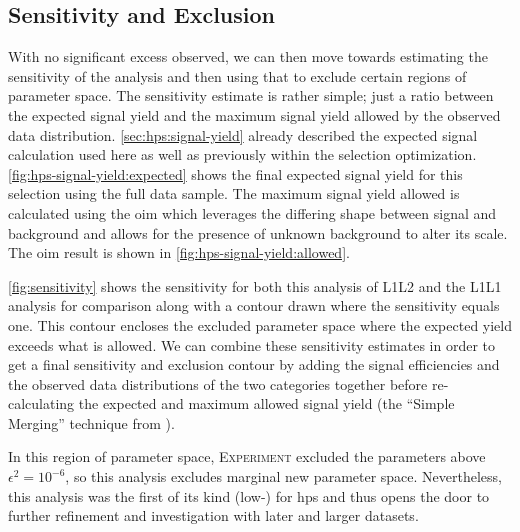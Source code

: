 \subsection{Sensitivity and Exclusion}
With no significant excess observed, we can then move towards estimating the sensitivity of
the analysis and then using that to exclude certain regions of parameter space.
The sensitivity estimate is rather simple; just a ratio between the expected signal yield
and the maximum signal yield allowed by the observed data distribution.
\cref{sec:hps:signal-yield} already described the expected signal calculation used here
as well as previously within the selection optimization.
\cref{fig:hps-signal-yield:expected} shows the final expected signal yield for this selection
using the full data sample.
The maximum signal yield allowed is calculated using the \ac{oim} \cite{yellin-oim:2002}
which leverages the differing shape between signal and background and allows for the presence
of unknown background to alter its scale.
The \ac{oim} result is shown in \cref{fig:hps-signal-yield:allowed}.

\cref{fig:sensitivity} shows the sensitivity for both this analysis of L1L2 and the L1L1 analysis
for comparison along with a contour drawn where the sensitivity equals one.
This contour encloses the excluded parameter space where the expected yield exceeds what is allowed.
We can combine these sensitivity estimates in order to get a final sensitivity and exclusion contour
by adding the signal efficiencies and the observed data distributions of the two categories together
before re-calculating the expected and maximum allowed signal yield (the ``Simple Merging'' technique
from \cite{yellin-oim-combine:2011}).

In this region of parameter space, \textsc{Experiment}
excluded the parameters above $\epsilon^2 = 10^{-6}$, so this analysis excludes marginal new parameter
space.
Nevertheless, this analysis was the first of its kind (low-\Psum) for \ac{hps} and thus
opens the door to further refinement and investigation with later and larger datasets.

